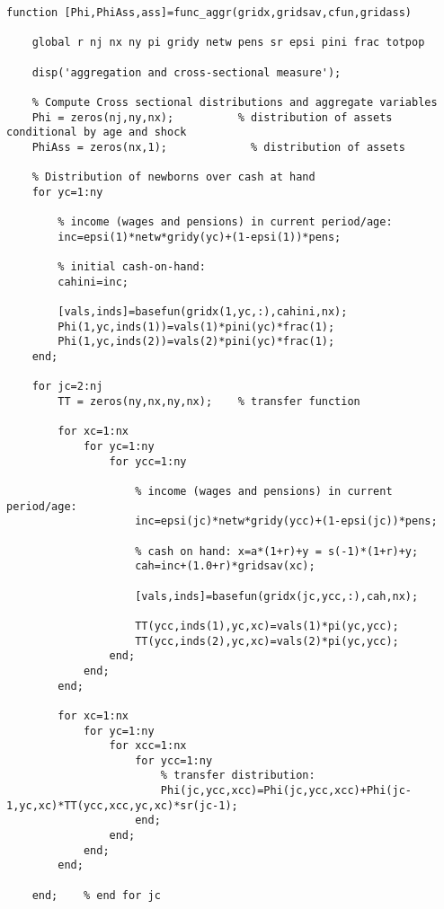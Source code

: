 \documentclass[12pt,a4paper]{article}
\begin{document}
\begin{lstlisting}[frame=single]
    function [Phi,PhiAss,ass]=func_aggr(gridx,gridsav,cfun,gridass)

    global r nj nx ny pi gridy netw pens sr epsi pini frac totpop
    
    disp('aggregation and cross-sectional measure');
    
    % Compute Cross sectional distributions and aggregate variables
    Phi = zeros(nj,ny,nx);          % distribution of assets conditional by age and shock
    PhiAss = zeros(nx,1);             % distribution of assets
    
    % Distribution of newborns over cash at hand
    for yc=1:ny
        
        % income (wages and pensions) in current period/age:
        inc=epsi(1)*netw*gridy(yc)+(1-epsi(1))*pens;
        
        % initial cash-on-hand:
        cahini=inc;
        
        [vals,inds]=basefun(gridx(1,yc,:),cahini,nx);
        Phi(1,yc,inds(1))=vals(1)*pini(yc)*frac(1);
        Phi(1,yc,inds(2))=vals(2)*pini(yc)*frac(1);
    end;
    
    for jc=2:nj
        TT = zeros(ny,nx,ny,nx);    % transfer function
        
        for xc=1:nx
            for yc=1:ny
                for ycc=1:ny
                    
                    % income (wages and pensions) in current period/age:
                    inc=epsi(jc)*netw*gridy(ycc)+(1-epsi(jc))*pens;
                    
                    % cash on hand: x=a*(1+r)+y = s(-1)*(1+r)+y;
                    cah=inc+(1.0+r)*gridsav(xc);
                    
                    [vals,inds]=basefun(gridx(jc,ycc,:),cah,nx);
                    
                    TT(ycc,inds(1),yc,xc)=vals(1)*pi(yc,ycc);
                    TT(ycc,inds(2),yc,xc)=vals(2)*pi(yc,ycc);
                end;    
            end;    
        end;    
        
        for xc=1:nx
            for yc=1:ny
                for xcc=1:nx
                    for ycc=1:ny
                        % transfer distribution:
                        Phi(jc,ycc,xcc)=Phi(jc,ycc,xcc)+Phi(jc-1,yc,xc)*TT(ycc,xcc,yc,xc)*sr(jc-1);
                    end;
                end;
            end;
        end;
        
    end;    % end for jc
    

\end{lstlisting}
\end{document}
